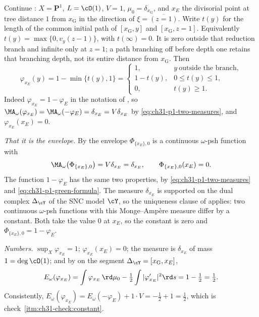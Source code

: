 \begin{example}
\label{ex:ch31-p1-green}
Continue : $X=\mathbf P^1$, $L=\cO(1)$,
$V=1$, $\mu_0=\delta_{x_{\mathrm G}}$, and $x_E$ the divisorial point
at tree distance $1$ from $x_{\mathrm G}$ in the direction of
$\xi=\overline{(z=1)}$.  Write $t(y)$ for the length of the common
initial path of $[x_{\mathrm G},y]$ and $[x_{\mathrm G},z=1]$.
Equivalently $t(y)=\max\{0,v_y(z-1)\}$, with $t(\infty)=0$.
It is zero outside that reduction branch and infinite only at $z=1$;
a path branching off before depth one retains that branching depth, not
its entire distance from $x_{\mathrm G}$.  Then
\begin{equation}
\label{eq:ch31-p1-green-formula}
 \varphi_{x_E}(y)=1-\min\{t(y),1\}
 =\begin{cases}
   1,&y\ \text{outside the branch},\\
   1-t(y),&0\leq t(y)\leq1,\\
   0,&t(y)\geq1 .
  \end{cases}
\end{equation}
Indeed $\varphi_{x_E}=1-\varphi_E$ in the notation of
, so
$\MA_\omega(\varphi_{x_E})=\MA_\omega(-\varphi_E)=\delta_{x_E}=V\delta_{x_E}$
by \eqref{eq:ch31-p1-two-measures}, and $\varphi_{x_E}(x_E)=0$.

\emph{That it is the envelope.}  By  the envelope
$\Phi_{\{x_E\},0}$ is a continuous $\omega$-psh function with
\[
 \MA_\omega\bigl(\Phi_{\{x_E\},0}\bigr)=V\delta_{x_E}=\delta_{x_E},
 \qquad
 \Phi_{\{x_E\},0}(x_E)=0 .
\]
The function $1-\varphi_E$ has the same two properties, by
\eqref{eq:ch31-p1-two-measures} and
\eqref{eq:ch31-p1-green-formula}.  The measure $\delta_{x_E}$ is supported
on the dual complex $\Delta_{\cY}$ of the SNC model $\cY$, so the
uniqueness clause of  applies: two continuous
$\omega$-psh functions with this Monge--Amp\`ere measure differ by a
constant.  Both take the value $0$ at $x_E$, so the constant is zero and
$\Phi_{\{x_E\},0}=1-\varphi_E$.

\emph{Numbers.}  $\sup_X\varphi_{x_E}=1$; $\varphi_{x_E}(x_E)=0$; the
measure is $\delta_{x_E}$ of mass $1=\deg\cO(1)$; and by
 on the segment
$\Delta_{\cY}=[x_{\mathrm G},x_E]$,
\[
 E_\omega(\varphi_{x_E})
 =\int\varphi_{x_E}\,\rd\mu_0-\tfrac12\int|\varphi_{x_E}'|^2\rd s
 =1-\tfrac12=\tfrac12 .
\]
Consistently, $E_\omega(\varphi_{x_E})=E_\omega(-\varphi_E)+1\cdot V
 =-\tfrac12+1=\tfrac12$, which is
check~\cref{itm:ch31-check:constant}.
\end{example}

